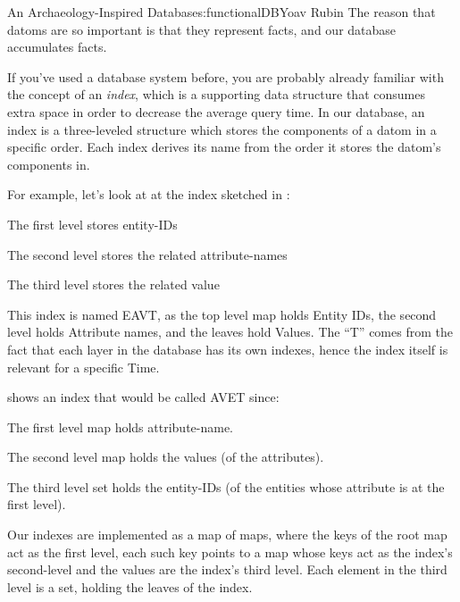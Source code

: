 \begin{aosachapter}{An Archaeology-Inspired Database}{s:functionalDB}{Yoav Rubin}
The reason that datoms are so important is that they represent facts,
and our database accumulates facts.

If you've used a database system before, you are probably already
familiar with the concept of an \emph{index}, which is a supporting data
structure that consumes extra space in order to decrease the average
query time. In our database, an index is a three-leveled structure which
stores the components of a datom in a specific order. Each index derives
its name from the order it stores the datom's components in.

For example, let's look at at the index sketched in
:

\begin{aosaitemize}

\item
  The first level stores entity-IDs
\item
  The second level stores the related attribute-names
\item
  The third level stores the related value
\end{aosaitemize}

This index is named EAVT, as the top level map holds Entity IDs, the
second level holds Attribute names, and the leaves hold Values. The
``T'' comes from the fact that each layer in the database has its own
indexes, hence the index itself is relevant for a specific Time.


 shows an index that would be called
AVET since:

\begin{aosaitemize}

\item
  The first level map holds attribute-name.
\item
  The second level map holds the values (of the attributes).
\item
  The third level set holds the entity-IDs (of the entities whose
  attribute is at the first level).
\end{aosaitemize}


Our indexes are implemented as a map of maps, where the keys of the root
map act as the first level, each such key points to a map whose keys act
as the index's second-level and the values are the index's third level.
Each element in the third level is a set, holding the leaves of the
index.


\end{aosachapter}
